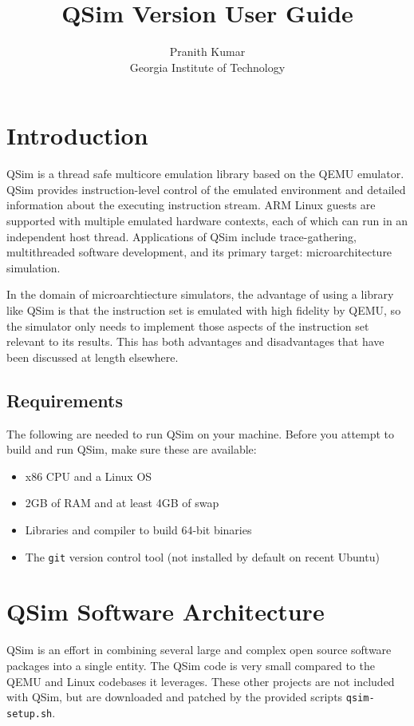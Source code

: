 \documentclass[letterpaper, 10pt]{book}
\title{QSim Version \version User Guide}
\author{Pranith Kumar\\ Georgia Institute of Technology}
\begin{document}
\maketitle

\setcounter{tocdepth}{1}
\tableofcontents

\chapter*{Introduction}
QSim is a thread safe multicore emulation library based on the QEMU emulator.
QSim provides instruction-level control of the emulated environment and 
detailed information about the executing instruction stream. ARM Linux guests
are supported with multiple emulated hardware contexts, each of which can run
in an independent host thread. Applications of QSim include trace-gathering,
multithreaded software development, and its primary target: microarchitecture
simulation.

In the domain of microarchtiecture simulators, the advantage of using a library
like QSim is that the instruction set is emulated with high fidelity by QEMU, so
the simulator only needs to implement those aspects of the instruction set
relevant to its results. This has both advantages and disadvantages that have
been discussed at length elsewhere.


\section{Requirements}
The following are needed to run QSim on your machine. Before you attempt to build and run QSim, make sure these are available:

\begin{itemize}
  \item{x86 CPU and a Linux OS}
  \item{2GB of RAM and at least 4GB of swap}
  \item{Libraries and compiler to build 64-bit binaries}
  \item{The \texttt{git} version control tool (not installed by default on recent Ubuntu)}
\end{itemize}

\chapter{QSim Software Architecture} \label{chap:arch}
QSim is an effort in combining several large and complex open source software
packages into a single entity. The QSim code is very small compared to the
QEMU and Linux codebases it leverages. These other projects are not included
with QSim, but are downloaded and patched by the provided scripts
\texttt{qsim-setup.sh}.
\end{document}
